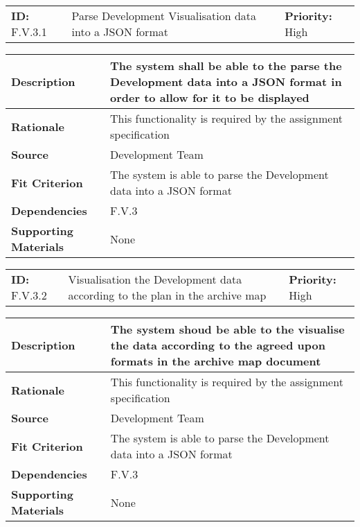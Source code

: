 \begin{table}[H]
    \begin{tabularx}{\textwidth}{| l | X | l |}
        \hline
        \textbf{ID:} F.V.3.1 & Parse Development Visualisation data into a JSON format & \textbf{Priority:} High \\
    \end{tabularx}
    \begin{tabularx}{\textwidth}{| l | X |}
        \hline
        \textbf{Description} & The system shall be able to the parse the Development data into a JSON format in order to allow for it to be displayed\\ \hline
        \textbf{Rationale} & This functionality is required by the assignment specification\\ \hline
        \textbf{Source} & Development Team\\ \hline
        \textbf{Fit Criterion} & The system is able to parse the Development data into a JSON format\\ \hline
        \textbf{Dependencies} & F.V.3 \\ \hline
        \textbf{Supporting Materials} & None \\ \hline
    \end{tabularx}
\end{table}

\begin{table}[H]
    \begin{tabularx}{\textwidth}{| l | X | l |}
        \hline
        \textbf{ID:} F.V.3.2 & Visualisation the Development data according to the plan in the archive map & \textbf{Priority:} High \\
    \end{tabularx}
    \begin{tabularx}{\textwidth}{| l | X |}
        \hline
        \textbf{Description} & The system shoud be able to the visualise the data according to the agreed upon formats in the archive map document\\ \hline
        \textbf{Rationale} & This functionality is required by the assignment specification\\ \hline
        \textbf{Source} & Development Team\\ \hline
        \textbf{Fit Criterion} & The system is able to parse the Development data into a JSON format\\ \hline
        \textbf{Dependencies} & F.V.3 \\ \hline
        \textbf{Supporting Materials} & None \\ \hline
    \end{tabularx}
\end{table}

